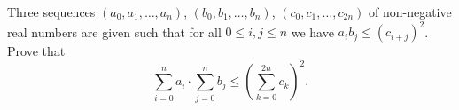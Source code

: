 Three sequences $(a_0, a_1, \ldots, a_n)$, $(b_0, b_1, \ldots, b_{n})$, $(c_0, c_1, \ldots, c_{2n})$ of non-negative real numbers are given such that for all $0\leq i,j\leq n$ we have $a_ib_j\leq (c_{i+j})^2$. Prove that
$$\sum_{i=0}^n a_i\cdot\sum_{j=0}^n b_j\leq \left( \sum_{k=0}^{2n} c_k\right)^2.$$